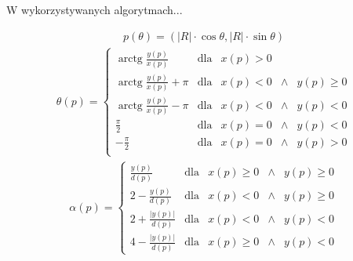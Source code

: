         W wykorzystywanych algorytmach... 
        \begin{center}
    		
    	\end{center}
        \begin{align}
        	p\left(\theta\right) = \left( 
        		\left|R\right| \cdot \cos \theta , 
        		\left|R\right| \cdot \sin \theta
        	\right)
        \end{align}
        \begin{align}
        	\theta\left(p\right) = \left\{
        		\begin{array}{lclcr}
        			\operatorname {arctg} \frac{y\left(p\right)}{x\left(p\right)}& \text{dla} & x\left(p\right) > 0 \\
        			\operatorname {arctg} \frac{y\left(p\right)}{x\left(p\right)} + \pi& \text{dla} & x\left(p\right) < 0 & \wedge & y\left(p\right) \geqslant 0 \\
        			\operatorname {arctg} \frac{y\left(p\right)}{x\left(p\right)} - \pi& \text{dla} & x\left(p\right) < 0 & \wedge & y\left(p\right) < 0 \\
        			\frac{\pi}{2}& \text{dla} & x\left(p\right) = 0 & \wedge & y\left(p\right) < 0 \\
        			-\frac{\pi}{2}& \text{dla} & x\left(p\right) = 0 & \wedge & y\left(p\right) > 0 \\
        		\end{array}
        	\right.
        \end{align}
        \begin{align}
        	\alpha\left( p\right) = \left\{
        		\begin{array}{lclcr}
        			\frac{y\left(p\right)}{d\left(p\right)} & \text{dla} &
        			x\left(p\right) \geqslant 0 & \wedge & y\left(p\right) \geqslant 0 \\
        			2 - \frac{y\left(p\right)}{d\left(p\right)} & \text{dla} &
        			x\left(p\right) < 0 & \wedge & y\left(p\right) \geqslant 0 \\
        			2 + \frac{\left|y\left(p\right)\right|}{d\left(p\right)} & \text{dla} &
        			x\left(p\right) < 0 & \wedge & y\left(p\right) < 0 \\
        			4 - \frac{\left|y\left(p\right)\right|}{d\left(p\right)} & \text{dla} &
        			x\left(p\right) \geqslant 0 & \wedge & y\left(p\right) < 0
        		\end{array}
        	\right.
        \end{align}
